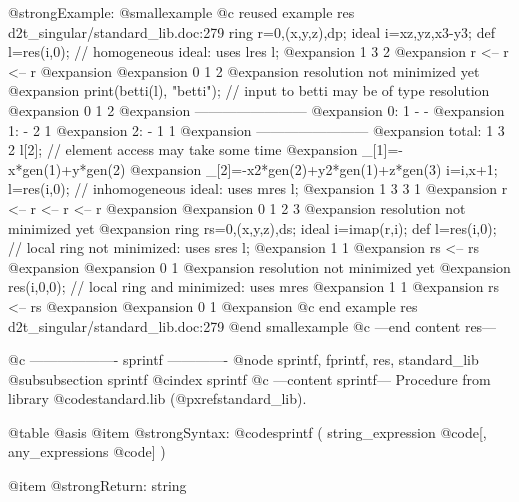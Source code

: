 @strong{Example:}
@smallexample
@c reused example res d2t_singular/standard_lib.doc:279 
  ring r=0,(x,y,z),dp;
ideal i=xz,yz,x3-y3;
def l=res(i,0); // homogeneous ideal: uses lres
l;
@expansion{}  1      3      2      
@expansion{} r <--  r <--  r
@expansion{} 
@expansion{} 0      1      2      
@expansion{} resolution not minimized yet
@expansion{} 
print(betti(l), "betti"); // input to betti may be of type resolution
@expansion{}            0     1     2
@expansion{} ------------------------
@expansion{}     0:     1     -     -
@expansion{}     1:     -     2     1
@expansion{}     2:     -     1     1
@expansion{} ------------------------
@expansion{} total:     1     3     2
l[2];         // element access may take some time
@expansion{} _[1]=-x*gen(1)+y*gen(2)
@expansion{} _[2]=-x2*gen(2)+y2*gen(1)+z*gen(3)
i=i,x+1;
l=res(i,0);   // inhomogeneous ideal: uses mres
l;
@expansion{}  1      3      3      1      
@expansion{} r <--  r <--  r <--  r
@expansion{} 
@expansion{} 0      1      2      3      
@expansion{} resolution not minimized yet
@expansion{} 
ring rs=0,(x,y,z),ds;
ideal i=imap(r,i);
def l=res(i,0); // local ring not minimized: uses sres
l;
@expansion{}   1       1       
@expansion{} rs <--  rs
@expansion{} 
@expansion{} 0       1       
@expansion{} resolution not minimized yet
@expansion{} 
res(i,0,0);     // local ring and minimized: uses mres
@expansion{}   1       1       
@expansion{} rs <--  rs
@expansion{} 
@expansion{} 0       1       
@expansion{} 
@c end example res d2t_singular/standard_lib.doc:279
@end smallexample
@c ---end content res---

@c ------------------- sprintf -------------
@node sprintf, fprintf, res, standard_lib
@subsubsection sprintf
@cindex sprintf
@c ---content sprintf---
Procedure from library @code{standard.lib} (@pxref{standard_lib}).

@table @asis
@item @strong{Syntax:}
@code{sprintf (} string_expression @code{[,} any_expressions
@code{] )}

@item @strong{Return:}
string

